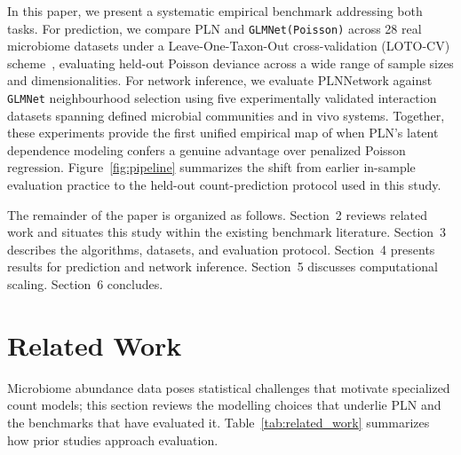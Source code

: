 \documentclass{jmlr}
\begin{document}
In this paper, we present a systematic empirical benchmark addressing both tasks.
For prediction, we compare PLN and \texttt{GLMNet(Poisson)} across 28 real microbiome datasets under a Leave-One-Taxon-Out cross-validation (LOTO-CV) scheme~\cite{agyapong2025cross}, evaluating held-out Poisson deviance across a wide range of sample sizes and dimensionalities.
For network inference, we evaluate PLNNetwork against \texttt{GLMNet} neighbourhood selection using five experimentally validated interaction datasets spanning defined microbial communities and in vivo systems.
Together, these experiments provide the first unified empirical map of when PLN's latent dependence modeling confers a genuine advantage over penalized Poisson regression.
Figure~\ref{fig:pipeline} summarizes the shift from earlier in-sample evaluation practice to the held-out count-prediction protocol used in this study.

The remainder of the paper is organized as follows.
Section~2 reviews related work and situates this study within the existing benchmark literature.
Section~3 describes the algorithms, datasets, and evaluation protocol.
Section~4 presents results for prediction and network inference.
Section~5 discusses computational scaling.
Section~6 concludes.

\section{Related Work}

Microbiome abundance data poses statistical challenges that motivate specialized count models; this section reviews the modelling choices that underlie PLN and the benchmarks that have evaluated it.
Table~\ref{tab:related_work} summarizes how prior studies approach evaluation.
\end{document}
